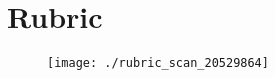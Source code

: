 \section{Rubric} \label{myRubric}

\begin{figure}[ht!]
	\centering
	\texttt{[image: ./rubric\_scan\_20529864]}
\end{figure}
